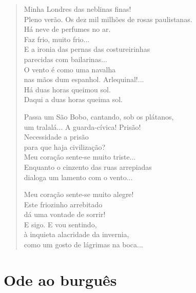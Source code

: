 \begin{verse}
Minha Londres das neblinas finas!\\
Pleno verão. Os dez mil milhões de rosas paulistanas.\\
Há neve de perfumes no ar.\\
Faz frio, muito frio...\\
E a ironia das pernas das costureirinhas\\
parecidas com bailarinas...\\
O vento é como uma navalha\\
nas mãos dum espanhol. Arlequinal!...\\
Há duas horas queimou sol.\\
Daqui a duas horas queima sol.

Passa um São Bobo, cantando, sob os plátanos,\\
um tralalá... A guarda-cívica! Prisão!\\
Necessidade a prisão\\
para que haja civilização?\\
Meu coração sente-se muito triste...\\
Enquanto o cinzento das ruas arrepiadas\\
dialoga um lamento com o vento...

Meu coração sente-se muito alegre!\\
Este friozinho arrebitado\\
dá uma vontade de sorrir!\\
E sigo. E vou sentindo,\\
à inquieta alacridade da invernia,\\
como um gosto de lágrimas na boca...
\end{verse}

\chapter{Ode ao burguês}

